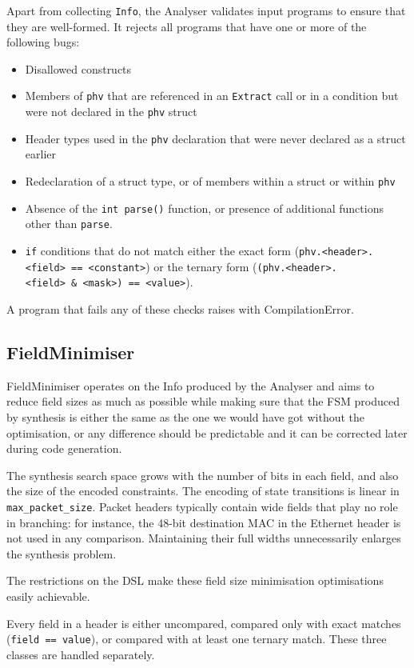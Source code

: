 Apart from collecting \texttt{Info}, the Analyser validates input programs to ensure that they are well-formed.
It rejects all programs that have one or more of the following bugs:
\begin{itemize}
    \item Disallowed constructs
    \item Members of \texttt{phv} that are referenced in an \texttt{Extract} call or in a condition but were not declared in the \texttt{phv} struct
    \item Header types used in the \texttt{phv} declaration that were never declared as a struct earlier
    \item Redeclaration of a struct type, or of members within a struct or within \texttt{phv}
    \item Absence of the \texttt{int parse()} function, or presence of additional functions other than \texttt{parse}.
    \item \texttt{if} conditions that do not match either the exact form (\texttt{phv.<header>.<field>~==~<constant>}) or the ternary form (\texttt{(phv.<header>.<field>~\&~<mask>)~==~<value>}).
\end{itemize}
A program that fails any of these checks raises with CompilationError.

\subsection{FieldMinimiser}
\label{sec:field-size-min}

FieldMinimiser operates on the Info produced by the Analyser and aims to reduce field sizes as much as possible while
making sure that the FSM produced by synthesis is either the same as the
one we would have got without the optimisation, or any difference should be predictable and it
can be corrected later during code generation.

The synthesis search space grows with the number of bits in each field,
and also the size of the encoded constraints. The encoding of state
transitions is linear in \texttt{max\_packet\_size}. Packet headers
typically contain wide fields that play no role in branching: for
instance, the 48-bit destination MAC in the Ethernet header is not used in
any comparison. Maintaining their full widths unnecessarily enlarges the synthesis problem.

The restrictions on the DSL make these field size minimisation optimisations easily achievable.

Every field in a header is either uncompared, compared only with exact
matches (\texttt{field == value}), or compared with at least one ternary
match. These three classes are handled separately.

